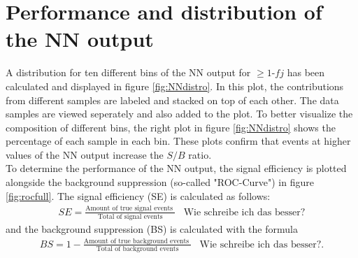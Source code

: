 \section{Performance and distribution of the NN output}
A distribution for ten different bins of the NN output for $\geq 1\text{-}fj$ has been calculated and displayed in figure \ref{fig:NNdistro}. In this plot, the contributions from different samples are labeled and stacked on top of each other. The data samples are viewed seperately and also added to the plot.
To better visualize the composition of different bins, the right plot in figure \ref{fig:NNdistro} shows the percentage of each sample in each bin. These plots confirm that events at higher values of the NN output increase the $S/B$ ratio.  \\ 
To determine the performance of the NN output, the signal efficiency is plotted alongside the background suppression (so-called "ROC-Curve") in figure \ref{fig:rocfull}. 
The signal efficiency (SE) is calculated as follows: 
\begin{align*}
    SE = \frac{\text{Amount of true signal events }}{\text{Total of signal events}} & \text{Wie schreibe ich das besser?}
\end{align*}
and the background suppression (BS) is calculated with the formula
\begin{align*}
    BS = 1 - \frac{\text{Amount of true background events }}{\text{Total of background events}} & \text{Wie schreibe ich das besser?}.
\end{align*}




